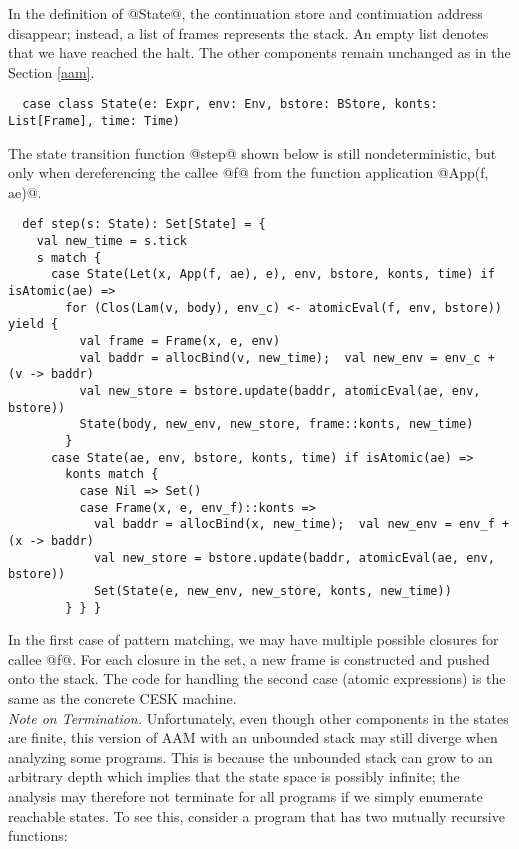 \documentclass[acmsmall, screen]{acmart}\settopmatter{}
\begin{document}
In the definition of @State@, the continuation store and continuation address disappear;
instead, a list of frames represents the stack. An empty list denotes that we have reached
the halt. The other components remain unchanged as in the Section \ref{aam}.

\begin{lstlisting}
  case class State(e: Expr, env: Env, bstore: BStore, konts: List[Frame], time: Time)
\end{lstlisting}

The state transition function @step@ shown below is still nondeterministic, but only when 
dereferencing the callee @f@ from the function application @App(f, ae)@.

\begin{lstlisting}
  def step(s: State): Set[State] = {
    val new_time = s.tick
    s match {
      case State(Let(x, App(f, ae), e), env, bstore, konts, time) if isAtomic(ae) =>
        for (Clos(Lam(v, body), env_c) <- atomicEval(f, env, bstore)) yield {
          val frame = Frame(x, e, env)
          val baddr = allocBind(v, new_time);  val new_env = env_c + (v -> baddr)
          val new_store = bstore.update(baddr, atomicEval(ae, env, bstore))
          State(body, new_env, new_store, frame::konts, new_time)
        }
      case State(ae, env, bstore, konts, time) if isAtomic(ae) =>
        konts match {
          case Nil => Set()
          case Frame(x, e, env_f)::konts =>
            val baddr = allocBind(x, new_time);  val new_env = env_f + (x -> baddr)
            val new_store = bstore.update(baddr, atomicEval(ae, env, bstore))
            Set(State(e, new_env, new_store, konts, new_time))
        } } }
\end{lstlisting}

In the first case of pattern matching, we may have multiple possible closures for callee @f@.
For each closure in the set, a new frame is constructed and pushed onto the stack.
The code for handling the second case (atomic expressions) is the same as the concrete CESK machine. \\

\textit{Note on Termination.}
Unfortunately, even though other components in the states are finite, this version of AAM with an unbounded
stack may still diverge when analyzing some programs.
This is because the unbounded stack can grow to an arbitrary depth which implies that the state
space is possibly infinite; the analysis may therefore not terminate for all programs if we
simply enumerate reachable states. To see this, consider a program that has two mutually
recursive functions:
\end{document}
